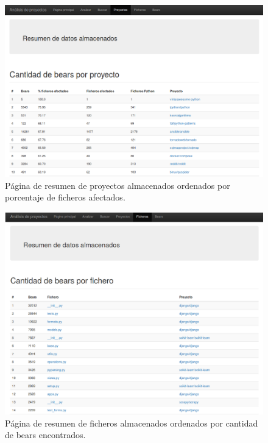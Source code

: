 \documentclass[a4paper, 12pt]{book}
\begin{document}
\begin{figure}[H]
  \centering
  \includegraphics[width=12cm, keepaspectratio]{img/resumenProyectos}
  \caption{Página de resumen de proyectos almacenados ordenados por porcentaje de ficheros afectados.}
  \label{fig:resumenProyectos}
\end{figure}

\begin{figure}[H]
  \centering
  \includegraphics[width=12cm, keepaspectratio]{img/resumenFicheros}
  \caption{Página de resumen de ficheros almacenados ordenados por cantidad de bears encontrados.}
  \label{fig:resumenFicheros}
\end{figure}
\end{document}
